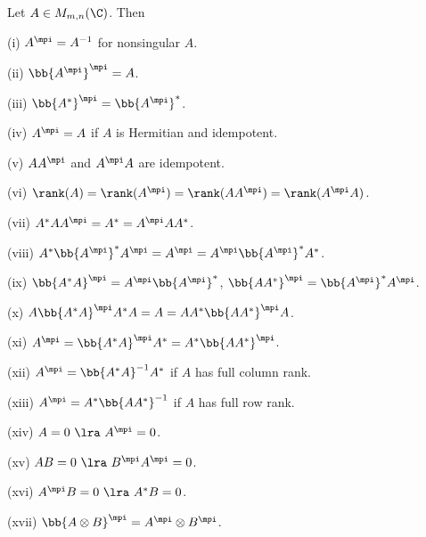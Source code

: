 \begin{proposition}\label{pro:mp_inverse_basic_properties}
Let $A\in M_{m,n}(\C)$. Then
\ben
\item [(i)] $A^\mpi = A^{-1}$ for nonsingular $A$.
\item [(ii)] $\bb{A^\mpi}^\mpi = A$.
\item [(iii)] $\bb{A^*}^\mpi = \bb{A^\mpi}^*$.
\item [(iv)] $A^\mpi =A$ if $A$ is Hermitian and idempotent.
\item [(v)] $AA^\mpi$ and $A^\mpi A$ are idempotent.
\item [(vi)] $\rank(A) = \rank(A^\mpi) = \rank(AA^\mpi) = \rank(A^\mpi A)$.
\item [(vii)] $A^*AA^\mpi = A^* = A^\mpi AA^*$.
\item [(viii)] $A^*\bb{A^\mpi}^* A^\mpi = A^\mpi = A^\mpi \bb{A^\mpi}^* A^*$.
\item [(ix)] $\bb{A^*A}^\mpi = A^\mpi \bb{A^\mpi}^*$, $\bb{AA^*}^\mpi = \bb{A^\mpi}^*A^\mpi $.
\item [(x)] $A\bb{A^*A}^\mpi A^*A = A = AA^*\bb{AA^*}^\mpi A$.
\item [(xi)] $A^\mpi = \bb{A^*A}^\mpi A^* = A^* \bb{AA^*}^\mpi$.
\item [(xii)] $A^\mpi = \bb{A^*A}^{-1} A^*$ if $A$ has full column rank.
\item [(xiii)] $A^\mpi = A^* \bb{AA^*}^{-1}$ if $A$ has full row rank.
\item [(xiv)] $A= 0 \ \lra \ A^\mpi = 0$.
\item [(xv)] $AB = 0 \ \lra \ B^\mpi A^\mpi = 0$.
\item [(xvi)] $A^\mpi B = 0 \ \lra\ A^* B = 0$.
\item [(xvii)] $\bb{A\otimes B}^\mpi = A^\mpi \otimes B^\mpi$.
\een
\end{proposition}

